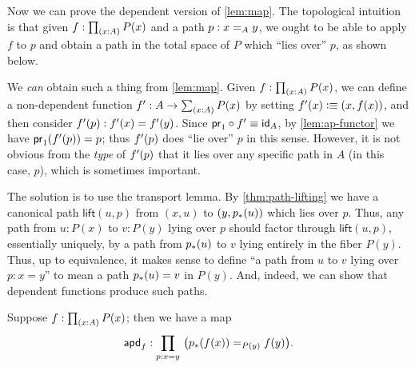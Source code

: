 Now we can prove the dependent version of \cref{lem:map}.
The topological intuition is that given $f:\prd{x:A} P(x)$ and a path $p:\id[A]xy$, we ought to be able to apply $f$ to $p$ and obtain a path in the total space of $P$ which ``lies over'' $p$, as shown below.

\begin{center}
\end{center}

We \emph{can} obtain such a thing from \cref{lem:map}.
Given $f:\prd{x:A} P(x)$, we can define a non-dependent function $f':A\to \sm{x:A} P(x)$ by setting $f'(x)\defeq (x,f(x))$, and then consider $\ap{f'}{p} : f'(x) = f'(y)$.
Since $\proj1 \circ f' \jdeq \idfunc[A]$, by \cref{lem:ap-functor} we have $\ap{\proj1}{\ap{f'}{p}} = p$; thus $\ap{f'}{p}$ does ``lie over'' $p$ in this sense.
However, it is not obvious from the \emph{type} of $\ap{f'}{p}$ that it lies over any specific path in $A$ (in this case, $p$), which is sometimes important.

The solution is to use the transport lemma.
By \cref{thm:path-lifting} we have a canonical path $\mathsf{lift}(u,p)$ from $(x,u)$ to $(y,\trans p u)$ which lies over $p$.
Thus, any path from $u:P(x)$ to $v:P(y)$ lying over $p$ should factor through $\mathsf{lift}(u,p)$, essentially uniquely, by a path from $\trans p u$ to $v$ lying entirely in the fiber $P(y)$.
Thus, up to equivalence, it makes sense to define ``a path from $u$ to $v$ lying over $p:x=y$'' to mean a path $\trans p u = v$ in $P(y)$.
And, indeed, we can show that dependent functions produce such paths.

\begin{lem}\label{lem:mapdep}
  Suppose $f:\prd{x: A} P(x)$; then we have a map
  \[\apdfunc f : \prd{p:x=y}\big(\id[P(y)]{\trans p{f(x)}}{f(y)}\big).\]
\end{lem}

